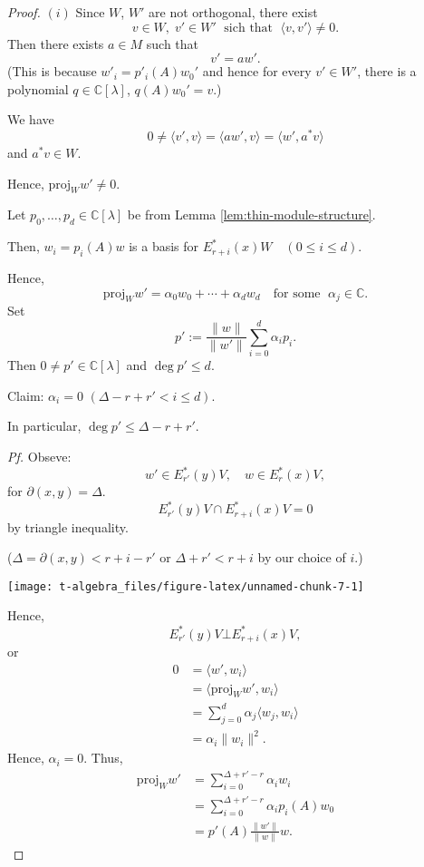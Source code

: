 \documentclass[
]{book}
\theoremstyle{definition}
\theoremstyle{definition}
\theoremstyle{definition}
\theoremstyle{definition}
\theoremstyle{remark}
\begin{document}
\begin{proof}
\((i)\) Since \(W\), \(W'\) are not orthogonal, there exist
\[v\in W, \; v'\in W' \; \text{ sich that }\; \langle v, v'\rangle \neq 0.\]
Then there exists \(a\in M\) such that
\[v' = aw'.\]
(This is because \(w'_i = p'_i(A)w_0'\) and hence for every \(v'\in W'\), there is a polynomial \(q\in \mathbb{C}[\lambda]\), \(q(A)w_0' = v\).)

We have
\[0\neq \langle v', v\rangle = \langle aw', v\rangle = \langle w', a^*v\rangle\]
and \(a^*v\in W\).

Hence, \(\mathrm{proj}_{W} w' \neq 0\).

Let \(p_0, \ldots, p_d\in \mathbb{C}[\lambda]\) be from Lemma \ref{lem:thin-module-structure}.

Then, \(w_i = p_i(A)w\) is a basis for \(E^*_{r+i}(x)W \quad (0\leq i\leq d)\).

Hence,
\[\mathrm{proj}_{W}w' = \alpha_0w_0 + \cdots + \alpha_dw_d \quad \text{for some }\; \alpha_j\in \mathbb{C}.\]
Set
\[p' := \frac{\|w\|}{\|w'\|}\sum_{i=0}^d \alpha_ip_i.\]
Then \(0\neq p'\in \mathbb{C}[\lambda]\) and \(\deg p' \leq d\).

Claim: \(\alpha_i = 0\) \((\Delta - r + r' < i\leq d)\).

In particular, \(\deg p' \leq \Delta - r + r'\).

\emph{Pf.} Obseve:
\[w'\in E^*_{r'}(y)V, \quad w \in E^*_r(x)V,\]
for \(\partial(x,y) = \Delta\).
\[E^*_{r'}(y)V \cap E^*_{r+i}(x)V = 0\]
by triangle inequality.

(\(\Delta = \partial(x,y) < r+i - r'\) or \(\Delta + r' < r + i\) by our choice of \(i\).)

\begin{center}\texttt{[image: t-algebra\_files/figure-latex/unnamed-chunk-7-1]} \end{center}

Hence,
\[E^*_{r'}(y)V \bot E^*_{r+i}(x)V,\]
or
\begin{align}
0 & = \langle w', w_i\rangle \\
& = \langle \mathrm{proj}_{W}w', w_i\rangle\\
& = \sum_{j=0}^d\alpha_j\langle w_j, w_i\rangle\\
& = \alpha_i\|w_i\|^2.
\end{align}
Hence, \(\alpha_i = 0\).
Thus,
\begin{align}
\mathrm{proj}_{W}w' & = \sum_{i=0}^{\Delta + r' - r}\alpha_iw_i\\
& = \sum_{i=0}^{\Delta + r' - r}\alpha_ip_i(A)w_0\\
& = p'(A)\frac{\|w'\|}{\|w\|}w.
\end{align}


\end{proof}
\end{document}
